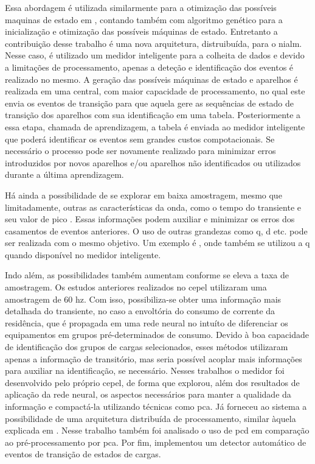 Essa abordagem é utilizada similarmente para a otimização das
possíveis maquinas de estado em \cite{nilm_distribuido}, contando também com 
algoritmo genético para a inicialização e otimização das possíveis máquinas de estado. 
Entretanto a contribuição desse trabalho é uma nova arquitetura, distruibuída, para o \gls{nialm}. 
Nesse caso, é utilizado um medidor inteligente para a colheita de dados e devido a
limitações de processamento, apenas a deteção e identificação dos eventos é 
realizado no mesmo. A geração das possíveis máquinas de estado e
aparelhos é realizada em uma central, com maior capacidade de processamento, 
no qual este envia os eventos de transição para que aquela gere as sequências de
estado de transição dos aparelhos com sua identificação em uma tabela.
Posteriormente a essa etapa, chamada de aprendizagem, a tabela é enviada 
ao medidor inteligente que poderá identificar os eventos sem grandes custos
compotacionais. Se necessário o processo pode ser novamente
realizado para minimizar erros introduzidos por novos aparelhos e/ou aparelhos
não identificados ou utilizados durante a última aprendizagem.

Há ainda a possibilidade de se explorar em baixa amostragem, mesmo que 
limitadamente, outras as características da onda, como o tempo do transiente
e seu valor de pico \cite{nilm_cole_extra_info_surge}. Essas informações podem
auxiliar e minimizar os erros dos casamentos de eventos anteriores. O uso de
outras grandezas como \gls{q}, \gls{d} etc. pode ser realizada com o mesmo
objetivo. Um exemplo é \cite{nilm_distribuido}, onde também se utilizou a 
\gls{q} quando disponível no medidor inteligente.

Indo além, as possibilidades também aumentam conforme se eleva a taxa de amostragem. 
Os estudos anteriores realizados no \gls{cepel} \cite{alvaro,bezerra,aguiar} 
utilizaram uma amostragem de 60 \acrshort{hz}. 
Com isso, possibiliza-se obter uma informação mais detalhada do
transiente, no caso a envoltória do consumo de corrente da residência, 
que é propagada em uma rede neural no intuíto de diferenciar 
os equipamentos em grupos pré-determinados de consumo. Devido à boa capacidade
de identificação dos grupos de cargas selecionados, esses métodos utilizaram
apenas a informação de transitório, mas seria possível acoplar mais informações para
auxiliar na identificação, se necessário. Nesses trabalhos o medidor foi
desenvolvido pelo próprio \gls{cepel}, de forma que \cite{aguiar} explorou, além dos
resultados de aplicação da rede neural, os aspectos necessários para manter a qualidade da
informação e compactá-la utilizando técnicas como \gls{pca}. Já \cite{bezerra} forneceu 
ao sistema a possibilidade de uma arquitetura distribuída de processamento,
similar àquela explicada em \cite{nilm_distribuido}. Nesse trabalho também foi
analisado o uso de \gls{pcd} em comparação ao pré-processamento por \gls{pca}.
Por fim, \cite{alvaro} implementou um detector automático de eventos de
transição de estados de cargas.

